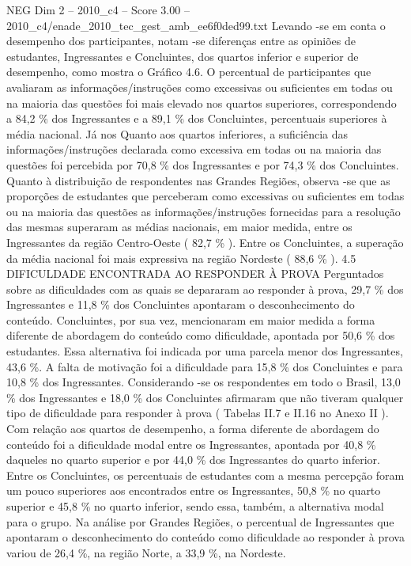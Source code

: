 \begin{textsample}{NEG Dim 2 – 2010\_c4 – Score 3.00 – 2010\_c4/enade\_2010\_tec\_gest\_amb\_ee6f0ded99.txt}
Levando -se em conta o desempenho dos participantes, notam -se diferenças entre as opiniões de estudantes, Ingressantes e Concluintes, dos quartos inferior e superior de desempenho, como mostra o Gráfico 4.6.
O percentual de participantes que avaliaram as informações/instruções como excessivas ou suficientes em todas ou na maioria das questões foi mais elevado nos quartos superiores, correspondendo a 84,2 \% dos Ingressantes e a 89,1 \% dos Concluintes, percentuais superiores à média nacional.
Já nos Quanto aos quartos inferiores, a suficiência das informações/instruções declarada como excessiva em todas ou na maioria das questões foi percebida por 70,8 \% dos Ingressantes e por 74,3 \% dos Concluintes.
Quanto à distribuição de respondentes nas Grandes Regiões, observa -se que as proporções de estudantes que perceberam como excessivas ou suficientes em todas ou na maioria das questões as informações/instruções fornecidas para a resolução das mesmas superaram as médias nacionais, em maior medida, entre os Ingressantes da região Centro-Oeste ( 82,7 \% ).
Entre os Concluintes, a superação da média nacional foi mais expressiva na região Nordeste ( 88,6 \% ). 4.5 DIFICULDADE ENCONTRADA AO RESPONDER À PROVA Perguntados sobre as dificuldades com as quais se depararam ao responder à prova, 29,7 \% dos Ingressantes e 11,8 \% dos Concluintes apontaram o desconhecimento do conteúdo.
Concluintes, por sua vez, mencionaram em maior medida a forma diferente de abordagem do conteúdo como dificuldade, apontada por 50,6 \% dos estudantes.
Essa alternativa foi indicada por uma parcela menor dos Ingressantes, 43,6 \%.
A falta de motivação foi a dificuldade para 15,8 \% dos Concluintes e para 10,8 \% dos Ingressantes.
Considerando -se os respondentes em todo o Brasil, 13,0 \% dos Ingressantes e 18,0 \% dos Concluintes afirmaram que não tiveram qualquer tipo de dificuldade para responder à prova ( Tabelas II.7 e II.16 no Anexo II ).
Com relação aos quartos de desempenho, a forma diferente de abordagem do conteúdo foi a dificuldade modal entre os Ingressantes, apontada por 40,8 \% daqueles no quarto superior e por 44,0 \% dos Ingressantes do quarto inferior.
Entre os Concluintes, os percentuais de estudantes com a mesma percepção foram um pouco superiores aos encontrados entre os Ingressantes, 50,8 \% no quarto superior e 45,8 \% no quarto inferior, sendo essa, também, a alternativa modal para o grupo.
Na análise por Grandes Regiões, o percentual de Ingressantes que apontaram o desconhecimento do conteúdo como dificuldade ao responder à prova variou de 26,4 \%, na região Norte, a 33,9 \%, na Nordeste.

\end{textsample}
